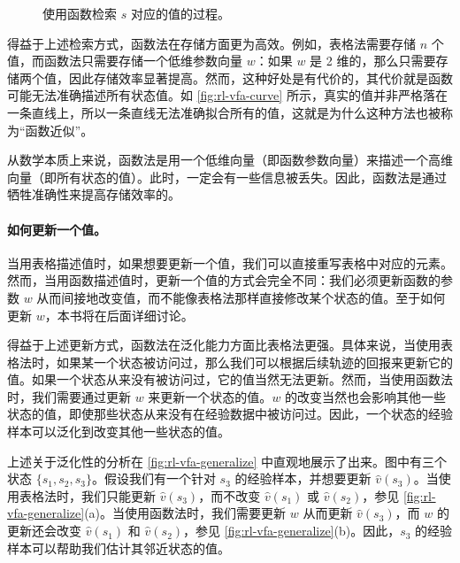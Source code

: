 \begin{figure}[ht]
\centering
{}
\caption{使用函数检索 $s$ 对应的值的过程。}
\label{fig:rl-vfa-retrieve}
\end{figure}

得益于上述检索方式，函数法在存储方面更为高效。例如，表格法需要存储 $n$ 个值，而函数法只需要存储一个低维参数向量 $w$：如果 $w$ 是 2 维的，那么只需要存储两个值，因此存储效率显著提高。然而，这种好处是有代价的，其代价就是函数可能无法准确描述所有状态值。如 \cref{fig:rl-vfa-curve} 所示，真实的值并非严格落在一条直线上，所以一条直线无法准确拟合所有的值，这就是为什么这种方法也被称为“函数近似”。

从数学本质上来说，函数法是用一个低维向量（即函数参数向量）来描述一个高维向量（即所有状态的值）。此时，一定会有一些信息被丢失。因此，函数法是通过牺牲准确性来提高存储效率的。

\paragraph{如何更新一个值。}当用表格描述值时，如果想要更新一个值，我们可以直接重写表格中对应的元素。然而，当用函数描述值时，更新一个值的方式会完全不同：我们必须更新函数的参数 $w$ 从而间接地改变值，而不能像表格法那样直接修改某个状态的值。至于如何更新 $w$，本书将在后面详细讨论。

得益于上述更新方式，函数法在泛化能力方面比表格法更强。具体来说，当使用表格法时，如果某一个状态被访问过，那么我们可以根据后续轨迹的回报来更新它的值。如果一个状态从来没有被访问过，它的值当然无法更新。然而，当使用函数法时，我们需要通过更新 $w$ 来更新一个状态的值。$w$ 的改变当然也会影响其他一些状态的值，即使那些状态从来没有在经验数据中被访问过。因此，一个状态的经验样本可以泛化到改变其他一些状态的值。

上述关于泛化性的分析在 \cref{fig:rl-vfa-generalize} 中直观地展示了出来。图中有三个状态 $\{s_1, s_2, s_3\}$。假设我们有一个针对 $s_3$ 的经验样本，并想要更新 $\hat{v}(s_3)$。当使用表格法时，我们只能更新 $\hat{v}(s_3)$，而不改变 $\hat{v}(s_1)$ 或 $\hat{v}(s_2)$，参见 \cref{fig:rl-vfa-generalize}(a)。当使用函数法时，我们需要更新 $w$ 从而更新 $\hat{v}(s_3)$，而 $w$ 的更新还会改变 $\hat{v}(s_1)$ 和 $\hat{v}(s_2)$，参见 \cref{fig:rl-vfa-generalize}(b)。因此，$s_3$ 的经验样本可以帮助我们估计其邻近状态的值。

